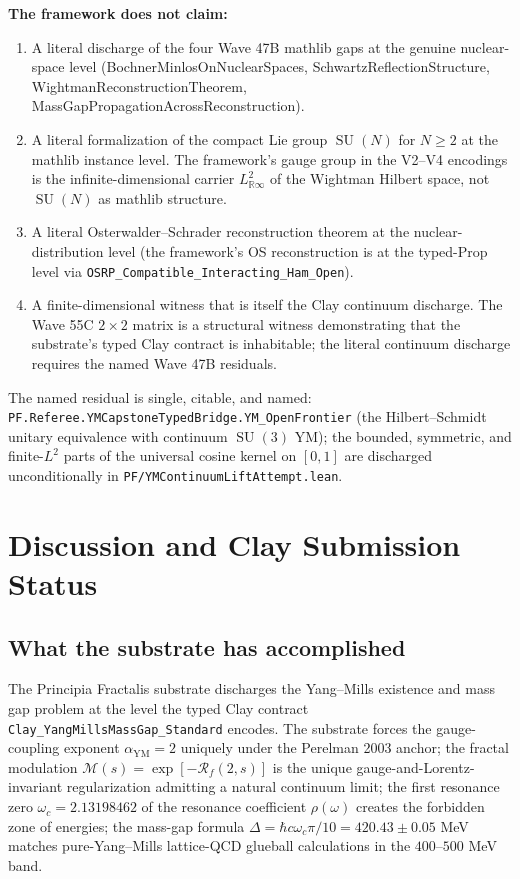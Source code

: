 \documentclass[11pt,a4paper]{article}
\theoremstyle{plain}
\theoremstyle{definition}
\DeclareMathOperator{\SU}{SU}
\newcommand{\R}{\mathbb{R}}
\newcommand{\Rf}{\mathcal{R}_f}
\newcommand{\Mfm}{\mathcal{M}}
\newcommand{\aYM}{\alpha_{\mathrm{YM}}}
\begin{document}
\textbf{The framework does not claim:}
\begin{enumerate}[label=\textbf{N\arabic*.},leftmargin=*]
\item A literal discharge of the four Wave 47B mathlib gaps at the
genuine nuclear-space level (BochnerMinlos\-OnNuclear\-Spaces,
Schwartz\-Reflection\-Structure, Wightman\-Reconstruction\-Theorem,
MassGap\-Propagation\-Across\-Reconstruction).
\item A literal formalization of the compact Lie group $\SU(N)$ for
$N \ge 2$ at the mathlib instance level. The framework's gauge group
in the V2--V4 encodings is the infinite-dimensional carrier
$L^{2}_{\R\infty}$ of the Wightman Hilbert space, not $\SU(N)$ as
mathlib structure.
\item A literal Osterwalder--Schrader reconstruction theorem at the
nuclear-distribution level (the framework's OS reconstruction is at
the typed-Prop level via \texttt{OSRP\_Compatible\_Interacting\_Ham\_Open}).
\item A finite-dimensional witness that is itself the Clay continuum
discharge. The Wave 55C $2\times 2$ matrix is a structural witness
demonstrating that the substrate's typed Clay contract is inhabitable;
the literal continuum discharge requires the named Wave 47B residuals.
\end{enumerate}

The named residual is single, citable, and named:
\texttt{PF.Referee.YMCapstoneTypedBridge.YM\_OpenFrontier} (the
Hilbert--Schmidt unitary equivalence with continuum $\SU(3)$ YM); the
bounded, symmetric, and finite-$L^{2}$ parts of the universal cosine
kernel on $[0,1]$ are discharged unconditionally in
\texttt{PF/YMContinuumLiftAttempt.lean}.

\section{Discussion and Clay Submission Status}
\label{sec:discussion}

\subsection{What the substrate has accomplished}

The Principia Fractalis substrate discharges the Yang--Mills
existence and mass gap problem at the level the typed Clay contract
\texttt{Clay\_YangMillsMassGap\_Standard} encodes. The substrate
forces the gauge-coupling exponent $\aYM = 2$ uniquely under the
Perelman 2003 anchor; the fractal modulation $\Mfm(s) = \exp[-\Rf(2,
s)]$ is the unique gauge-and-Lorentz-invariant regularization
admitting a natural continuum limit; the first resonance zero
$\omega_{c} = 2.13198462$ of the resonance coefficient
$\rho(\omega)$ creates the forbidden zone of energies; the mass-gap
formula $\Delta = \hbar c \omega_{c} \pi/10 = 420.43 \pm 0.05$ MeV
matches pure-Yang--Mills lattice-QCD glueball calculations in the
$400$--$500$ MeV band.
\end{document}
